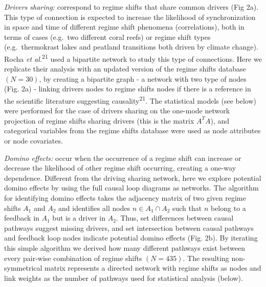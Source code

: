 \documentclass[9pt,]{article}
\begin{document}
\emph{Drivers sharing:} correspond to regime shifts that share common
drivers (Fig 2a). This type of connection is expected to increase the
likelihood of synchronization in space and time of different regime
shift phenomena (correlations), both in terms of cases (e.g.~two
different coral reefs) or regime shift types (e.g.~thermokrast lakes and
peatland transitions both driven by climate change). Rocha \emph{et
al.}\textsuperscript{21} used a bipartite network to study this type of
connections. Here we replicate their analysis with an updated version of
the regime shifts database \((N=30)\), by creating a bipartite graph - a
network with two type of nodes (Fig. 2a) - linking drivers nodes to
regime shifts nodes if there is a reference in the scientific literature
suggesting causality\textsuperscript{21}. The statistical models (see
below) were performed for the case of drivers sharing on the one-mode
network projection of regime shifts sharing drivers (this is the matrix
\(A^TA\)), and categorical variables from the regime shifts database
were used as node attributes or node covariates.

\emph{Domino effects:} occur when the occurrence of a regime shift can
increase or decrease the likelihood of other regime shift occurring,
creating a one-way dependence. Different from the driving sharing
network, here we explore potential domino effects by using the full
causal loop diagrams as networks. The algorithm for identifying domino
effects takes the adjacency matrix of two given regime shifts \(A_1\)
and \(A_2\) and identifies all nodes \(n \in A_1 \cap A_2\) such that
\(n\) belong to a feedback in \(A_1\) but is a driver in \(A_2\). Thus,
set differences between causal pathways suggest missing drivers, and set
intersection between causal pathways and feedback loop nodes indicate
potential domino effects (Fig. 2b). By iterating this simple algorithm
we derived how many different pathways exist between every pair-wise
combination of regime shifts \((N=435)\). The resulting non-symmetrical
matrix represents a directed network with regime shifts as nodes and
link weights as the number of pathways used for statistical analysis
(below).
\end{document}
